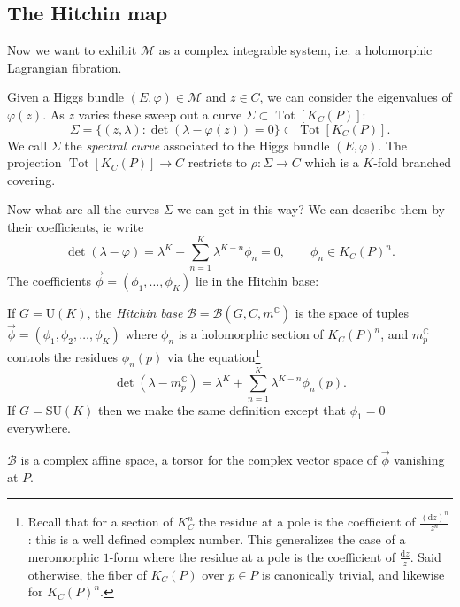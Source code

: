 \documentclass[12pt,letterpaper,reqno]{article}
\numberwithin{equation}{section}
\newcommand{\cB}{\ensuremath{\mathcal B}}
\newcommand{\cM}{\ensuremath{\mathcal M}}
\newcommand{\C}{\ensuremath{\mathbb C}}
\newcommand{\de}{\mathrm{d}}
\newcommand{\vphi}{{\vec\phi}}
\newcommand{\ti}[1]{\textit{#1}}
\DeclareMathOperator{\Tot}{Tot}
\newcommand{\SU}{\mathrm{SU}}
\newcommand{\U}{\mathrm{U}}
\newcommand{\insfig}[2]{

\medskip
\noindent
\begin{minipage}{\linewidth}

\makebox[\linewidth]{\texttt{[image: figures/\#1-crop.pdf]}}

\end{minipage}
\medskip

}
\begin{document}
\subsection{The Hitchin map}

Now we want to exhibit $\cM$ as a complex integrable system,
i.e. a holomorphic Lagrangian fibration.

Given a Higgs bundle $(E,\varphi) \in \cM$ and $z \in C$,
we can consider the eigenvalues of $\varphi(z)$. As $z$ varies
these sweep out a curve $\Sigma \subset \Tot[K_C(P)]$:
\begin{equation}
  \Sigma = \{ (z,\lambda): \det(\lambda - \varphi(z)) = 0\} \subset \Tot[K_C(P)].
\end{equation}
We call $\Sigma$
the \ti{spectral curve} associated to the Higgs 
bundle $(E,\varphi)$.
The projection $\Tot[K_C(P)] \to C$ 
restricts to $\rho: \Sigma \to C$ which is a $K$-fold branched covering.
\insfig{higgs-metric-17}{0.8}
Now what are all the curves $\Sigma$
we can get in this way?
We can describe them by their coefficients, ie write
\begin{equation} \label{eq:spectral-coeffs}
  \det(\lambda - \varphi) = \lambda^K + \sum_{n=1}^K \lambda^{K-n} \phi_n = 0, \qquad \phi_n \in K_C(P)^n.
\end{equation}
The coefficients $\vphi = (\phi_1, \dots, \phi_K)$ lie in the Hitchin base:

\begin{defn}
If $G = \U(K)$,
the \ti{Hitchin base} $\cB = \cB(G,C,m^\C)$ is
the space of tuples $\vphi = (\phi_1, \phi_2, \dots, \phi_K)$
where $\phi_n$ is a holomorphic section of $K_C(P)^n$,
and $m_p^\C$ controls the residues $\phi_n(p)$ via the equation\footnote{Recall that for a section of $K_C^n$ the residue at a pole is the coefficient of $\frac{(\de z)^n}{z^n}$: this is a well
defined complex number. This generalizes the case of a meromorphic $1$-form
where the residue at a pole is the coefficient of $\frac{\de z}{z}$. Said otherwise, the fiber of
$K_C(P)$ over $p \in P$ is canonically trivial,
and likewise for $K_C(P)^n$.}
\begin{equation}
  \det (\lambda - m_p^\C) = \lambda^K + \sum_{n=1}^K \lambda^{K-n} \phi_n(p).
\end{equation}
If $G = \SU(K)$ then we make the same definition except that
$\phi_1 = 0$ everywhere.
\end{defn}

$\cB$ is a complex affine space, a torsor for the complex vector space
of $\vphi$ vanishing at $P$.
\end{document}
